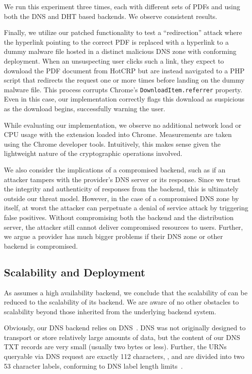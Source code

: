We run this experiment three times, each with different sets of PDFs and using
both the DNS and DHT based backends. We observe consistent results.

Finally, we utilize our patched functionality to test a ``redirection'' attack
where the hyperlink pointing to the correct PDF is replaced with a hyperlink to
a dummy malware file hosted in a distinct malicious DNS zone with conforming
\SYSTEM{} deployment. When an unsuspecting user clicks such a link, they expect
to download the PDF document from HotCRP but are instead navigated to a PHP
script that redirects the request one or more times before landing on the dummy
malware file. This process corrupts Chrome's \texttt{DownloadItem.referrer}
property. Even in this case, our implementation correctly flags this download as
suspicious as the download begins, successfully warning the user.

While evaluating our implementation, we observe no additional network load or
CPU usage with the extension loaded into Chrome. Measurements are taken using
the Chrome developer tools. Intuitively, this makes sense given the lightweight
nature of the cryptographic operations involved.

We also consider the implications of a compromised backend, such as if an
attacker tampers with the provider's DNS server or its response. Since we trust
the integrity and authenticity of responses from the backend, this is ultimately
outside our threat model. However, in the case of a compromised DNS zone by
itself, at worst the attacker can perpetuate a denial of service attack by
triggering false positives. Without compromising both the backend and the
distribution server, the attacker still cannot deliver compromised resources to
users. Further, we argue a provider has much bigger problems if their DNS zone
or other backend is compromised.

\subsection{Scalability and Deployment}

As \SYSTEM{} assumes a high availability backend, we conclude that the
scalability of \SYSTEM{} can be reduced to the scalability of its backend. We
are aware of no other obstacles to scalability beyond those inherited from the
underlying backend system.

Obviously, our DNS backend relies on DNS~\cite{DNS1}. DNS was not originally
designed to transport or store relatively large amounts of data, but the content
of our DNS TXT records are very small (usually two bytes or less). Further, the
URNs queryable via DNS request are exactly 112 characters, , and are divided into two 53 character labels, conforming to
DNS label length limits~\cite{DNS2}.

